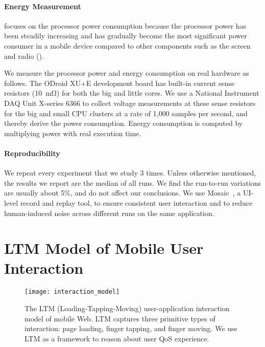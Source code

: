 \paragraph{Energy Measurement}  \webrt focuses on the processor power consumption because the processor power has been steadily increasing and has gradually become the most significant power consumer in a mobile device compared to other components such as the screen and radio ().

We measure the processor power and energy consumption on real hardware as follows. The ODroid XU+E development board has built-in current sense resistors (\SI{10}{\milli\ohm}) for both the big and little cores. We use a National Instrument DAQ Unit X-series 6366 to collect voltage measurements at these sense resistors for the big and small CPU clusters at a rate of 1,000 samples per second, and thereby derive the power consumption. Energy consumption is computed by multiplying power with real execution time.

\paragraph{Reproducibility} We repeat every experiment that we study 3 times. Unless otherwise mentioned, the results we report are the median of all runs. We find the run-to-run variations are usually about 5\%, and do not affect our conclusions. We use Mosaic~\cite{mosaic}, a UI-level record and replay tool, to ensure consistent user interaction and to reduce human-induced noise across different runs on the same application.

\section{LTM Model of Mobile User Interaction}
\label{sec:runtime:ltm}


\begin{figure}[t]
  \centering
  \texttt{[image: interaction\_model]}
  \caption{The LTM (Loading-Tapping-Moving) user-application interaction model of mobile Web. LTM captures three primitive types of interaction: page loading, finger tapping, and finger moving. We use LTM as a framework to reason about user QoS experience.}
  \label{fig:interaction}
\end{figure}


